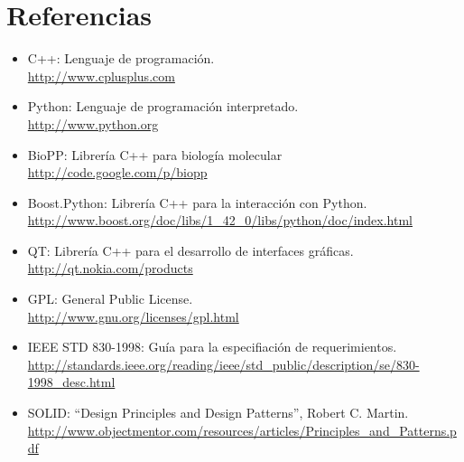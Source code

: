 \section{Referencias}
  \label{appendix-ref}
  \begin{itemize}
    \item C++: Lenguaje de programaci\'on. \\
    \url{http://www.cplusplus.com}
    \item Python: Lenguaje de programaci\'on interpretado.\\ 
    \url{http://www.python.org}
    \item BioPP: Librer\'ia C++ para biolog\'ia molecular\\
    \url{http://code.google.com/p/biopp}
    \item Boost.Python: Librer\'ia C++ para la interacci\'on con Python.\\
    \url{http://www.boost.org/doc/libs/1_42_0/libs/python/doc/index.html}
    \item QT: Librer\'ia C++ para el desarrollo de interfaces gr\'aficas.\\
    \url{http://qt.nokia.com/products}
    \item GPL: General Public License. \\
    \url{http://www.gnu.org/licenses/gpl.html}
    \item IEEE STD 830-1998: Gu\'ia para la especifiaci\'on de requerimientos. \\
    \url{http://standards.ieee.org/reading/ieee/std_public/description/se/830-1998_desc.html}
    \item SOLID: ``Design Principles and Design Patterns'', Robert C. Martin. \\
    \url{http://www.objectmentor.com/resources/articles/Principles_and_Patterns.pdf}    
  \end{itemize}
